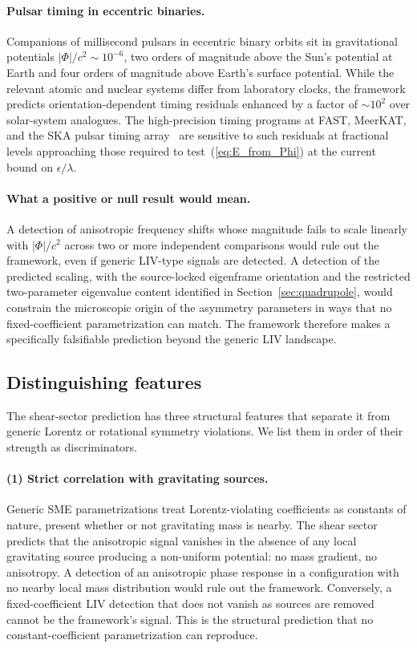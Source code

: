 \documentclass[pdflatex,sn-mathphys-num]{sn-jnl}%
\theoremstyle{thmstyleone}%
\theoremstyle{thmstyletwo}%
\theoremstyle{thmstylethree}%
\begin{document}
\paragraph{Pulsar timing in eccentric binaries.}
Companions of millisecond pulsars in eccentric binary orbits
sit in gravitational potentials $|\Phi|/c^2\sim 10^{-6}$, two
orders of magnitude above the Sun's potential at Earth and
four orders of magnitude above Earth's surface potential.
While the relevant atomic and nuclear systems differ from
laboratory clocks, the framework predicts orientation-dependent
timing residuals enhanced by a factor of $\sim 10^2$ over
solar-system analogues. The high-precision timing programs at
FAST, MeerKAT, and the SKA pulsar timing
array~\cite{Kramer2021} are sensitive to such residuals at
fractional levels approaching those required to
test~(\ref{eq:E_from_Phi}) at the current bound on
$\epsilon/\lambda$.

\paragraph{What a positive or null result would mean.}
A detection of anisotropic frequency shifts whose magnitude
fails to scale linearly with $|\Phi|/c^2$ across two or more
independent comparisons would rule out the framework, even if
generic LIV-type signals are detected. A detection of the
predicted scaling, with the source-locked eigenframe
orientation and the restricted two-parameter eigenvalue
content identified in Section~\ref{sec:quadrupole}, would
constrain the microscopic origin of the asymmetry parameters
in ways that no fixed-coefficient parametrization can match.
The framework therefore makes a specifically falsifiable
prediction beyond the generic LIV landscape.

\subsection{Distinguishing features}

The shear-sector prediction has three structural features
that separate it from generic Lorentz or rotational symmetry
violations. We list them in order of their strength as
discriminators.

\paragraph{(1) Strict correlation with gravitating sources.}
Generic SME parametrizations treat Lorentz-violating
coefficients as constants of nature, present whether or not
gravitating mass is nearby. The shear sector predicts that
the anisotropic signal vanishes in the absence of any local 
gravitating source producing a non-uniform potential: no mass 
gradient, no anisotropy. A detection of an anisotropic phase 
response in a configuration with no nearby local mass distribution 
would rule out the framework. Conversely, a fixed-coefficient 
LIV detection that does not vanish as sources are removed cannot 
be the framework's signal. This is the structural prediction that 
no constant-coefficient parametrization can reproduce.
\end{document}
